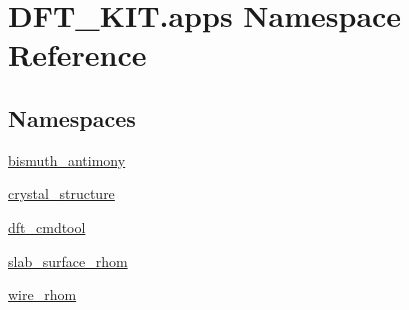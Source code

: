 \hypertarget{namespace_d_f_t___k_i_t_1_1apps}{\section{D\+F\+T\+\_\+\+K\+I\+T.\+apps Namespace Reference}
\label{namespace_d_f_t___k_i_t_1_1apps}
}
\subsection*{Namespaces}
\begin{DoxyCompactItemize}
\item 
 \hyperlink{namespace_d_f_t___k_i_t_1_1apps_1_1bismuth__antimony}{bismuth\+\_\+antimony}
\item 
 \hyperlink{namespace_d_f_t___k_i_t_1_1apps_1_1crystal__structure}{crystal\+\_\+structure}
\item 
 \hyperlink{namespace_d_f_t___k_i_t_1_1apps_1_1dft__cmdtool}{dft\+\_\+cmdtool}
\item 
 \hyperlink{namespace_d_f_t___k_i_t_1_1apps_1_1slab__surface__rhom}{slab\+\_\+surface\+\_\+rhom}
\item 
 \hyperlink{namespace_d_f_t___k_i_t_1_1apps_1_1wire__rhom}{wire\+\_\+rhom}
\end{DoxyCompactItemize}
